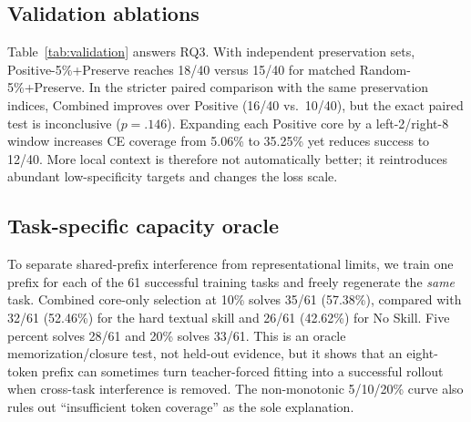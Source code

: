 \subsection{Validation ablations}



Table~\ref{tab:validation} answers RQ3.  With independent preservation sets, Positive-5\%+Preserve reaches 18/40 versus 15/40 for matched Random-5\%+Preserve.  In the stricter paired comparison with the same preservation indices, Combined improves over Positive (16/40 vs.\ 10/40), but the exact paired test is inconclusive ($p=.146$).  Expanding each Positive core by a left-2/right-8 window increases CE coverage from 5.06\% to 35.25\% yet reduces success to 12/40.  More local context is therefore not automatically better; it reintroduces abundant low-specificity targets and changes the loss scale.

\subsection{Task-specific capacity oracle}

To separate shared-prefix interference from representational limits, we train one prefix for each of the 61 successful training tasks and freely regenerate the \emph{same} task.  Combined core-only selection at 10\% solves 35/61 (57.38\%), compared with 32/61 (52.46\%) for the hard textual skill and 26/61 (42.62\%) for No Skill.  Five percent solves 28/61 and 20\% solves 33/61.  This is an oracle memorization/closure test, not held-out evidence, but it shows that an eight-token prefix can sometimes turn teacher-forced fitting into a successful rollout when cross-task interference is removed.  The non-monotonic 5/10/20\% curve also rules out ``insufficient token coverage'' as the sole explanation.
